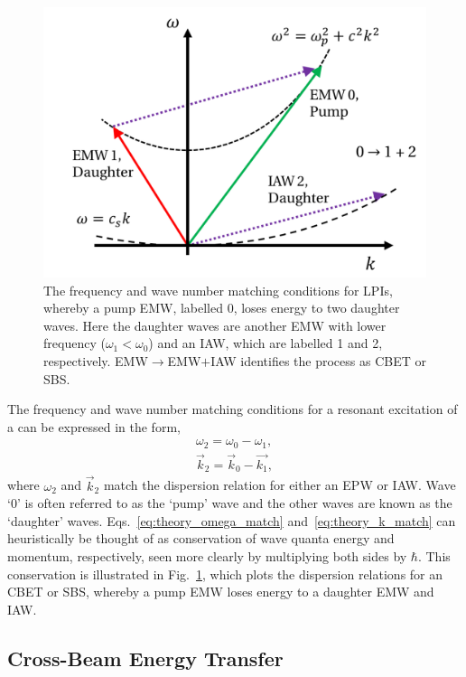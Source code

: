 \begin{figure}[t!]
    \includegraphics[width=0.6\linewidth]{Theory/Images/LPI_conservation_disprel.png}
    \centering
    \caption{The frequency and wave number matching conditions for \ac{LPIs}, whereby a pump \ac{EMW}, labelled 0, loses energy to two daughter waves.
        Here the daughter waves are another \ac{EMW} with lower frequency ($\omega_1<\omega_0$) and an \ac{IAW}, which are labelled 1 and 2, respectively.
        \ac{EMW}$\rightarrow$\ac{EMW}$+$\ac{IAW} identifies the process as \ac{CBET} or \ac{SBS}.
    }%
    \label{fig:theory_LPI_disprel}
\end{figure}

The frequency and wave number matching conditions for a resonant excitation of a  can be expressed in the form,
\begin{align}
    \label{eq:theory_omega_match}
    \omega_2 = \omega_0 - \omega_1,\\
    \label{eq:theory_k_match}
    \vec{k}_2 = \vec{k}_0 - \vec{k_1},
\end{align}
where $\omega_2$ and $\vec{k}_2$ match the dispersion relation for either an \ac{EPW} or \ac{IAW}.
Wave `0' is often referred to as the `pump' wave and the other waves are known as the `daughter' waves.
Eqs.~\ref{eq:theory_omega_match} and~\ref{eq:theory_k_match} can heuristically be thought of as conservation of wave quanta energy and momentum, respectively, seen more clearly by multiplying both sides by $\hbar$.
This conservation is illustrated in Fig.~\ref{fig:theory_LPI_disprel}, which plots the dispersion relations for an \ac{CBET} or \ac{SBS}, whereby a pump \ac{EMW} loses energy to a daughter \ac{EMW} and \ac{IAW}.

\subsection{Cross-Beam Energy Transfer}%
\label{sec:theory_CBET}

